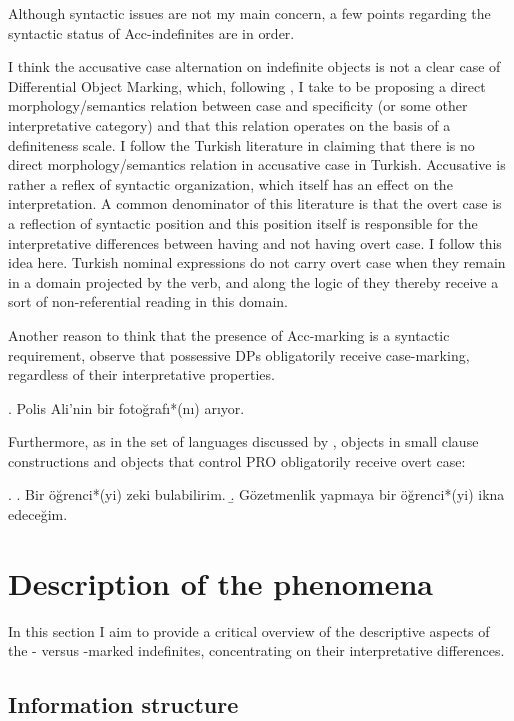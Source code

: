 \documentclass[11pt,a4paper]{article}
\begin{document}
Although syntactic issues are not my main concern, a few points regarding the syntactic status of Acc-indefinites are in order.

I think the accusative case alternation on indefinite objects is not a
clear case of Differential Object Marking, which, following
\cite{lopez12}, I take to be proposing a direct morphology/semantics
relation between case and specificity (or some other interpretative
category) and that this relation operates on the basis of a
definiteness scale. I follow the Turkish literature in claiming that
there is no direct morphology/semantics relation in accusative case in
Turkish. Accusative is rather a reflex of syntactic organization,
which itself has an effect on the interpretation. A common denominator
of this literature is that the overt case is a reflection of syntactic
position and this position itself is responsible for the
interpretative differences between having and not having overt case. I
follow this idea here. Turkish nominal expressions do not carry overt
case when they remain in a domain projected by the verb, and along the
logic of  they thereby receive a sort of
non-referential reading in this domain.


Another reason to think that the presence of Acc-marking is a
syntactic requirement, observe that possessive DPs obligatorily
receive case-marking, regardless of their interpretative properties.

\ex. Polis Ali'nin bir fotoğrafı*(nı) arıyor.

Furthermore, as in the set of languages discussed by \cite{lopez12},
objects in small clause constructions and objects that control PRO
obligatorily receive overt case:

\ex.
\a. Bir öğrenci*(yi) zeki bulabilirim.
\b. Gözetmenlik yapmaya bir öğrenci*(yi) ikna edeceğim. 


\section{Description of the phenomena}

In this section I aim to provide a critical overview of the
descriptive aspects of the \acc- versus \zero-marked indefinites,
concentrating on their interpretative differences.


\subsection{Information structure}
\end{document}
